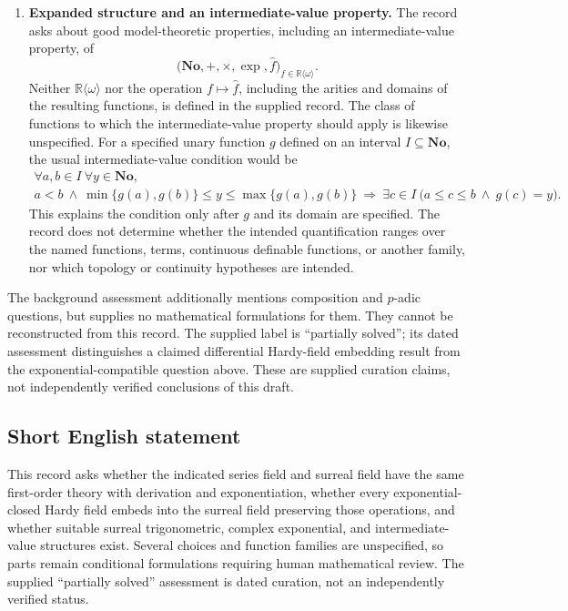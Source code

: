 \documentclass[11pt]{article}
\begin{document}
\begin{enumerate}
\item \textbf{Expanded structure and an intermediate-value property.} The record asks about good model-theoretic properties, including an intermediate-value property, of
\[
\bigl(\mathbf{No},+,\times,\exp,\widehat f\bigr)_{f\in\mathbb R\langle\omega\rangle}.
\]
Neither \(\mathbb R\langle\omega\rangle\) nor the operation \(f\mapsto\widehat f\), including the arities and domains of the resulting functions, is defined in the supplied record. The class of functions to which the intermediate-value property should apply is likewise unspecified. For a specified unary function \(g\) defined on an interval \(I\subseteq\mathbf{No}\), the usual intermediate-value condition would be
\[
\begin{gathered}
\forall a,b\in I\ \forall y\in\mathbf{No},\\
a<b\ \land\ \min\{g(a),g(b)\}\le y\le\max\{g(a),g(b)\}
\ \Longrightarrow\
\exists c\in I\ \bigl(a\le c\le b\ \land\ g(c)=y\bigr).
\end{gathered}
\]
This explains the condition only after \(g\) and its domain are specified. The record does not determine whether the intended quantification ranges over the named functions, terms, continuous definable functions, or another family, nor which topology or continuity hypotheses are intended.
\end{enumerate}

The background assessment additionally mentions composition and \(p\)-adic questions, but supplies no mathematical formulations for them. They cannot be reconstructed from this record. The supplied label is ``partially solved''; its dated assessment distinguishes a claimed differential Hardy-field embedding result from the exponential-compatible question above. These are supplied curation claims, not independently verified conclusions of this draft.
\subsection{Short English statement}
This record asks whether the indicated series field and surreal field have the same first-order theory with derivation and exponentiation, whether every exponential-closed Hardy field embeds into the surreal field preserving those operations, and whether suitable surreal trigonometric, complex exponential, and intermediate-value structures exist. Several choices and function families are unspecified, so parts remain conditional formulations requiring human mathematical review. The supplied ``partially solved'' assessment is dated curation, not an independently verified status.
\end{document}
